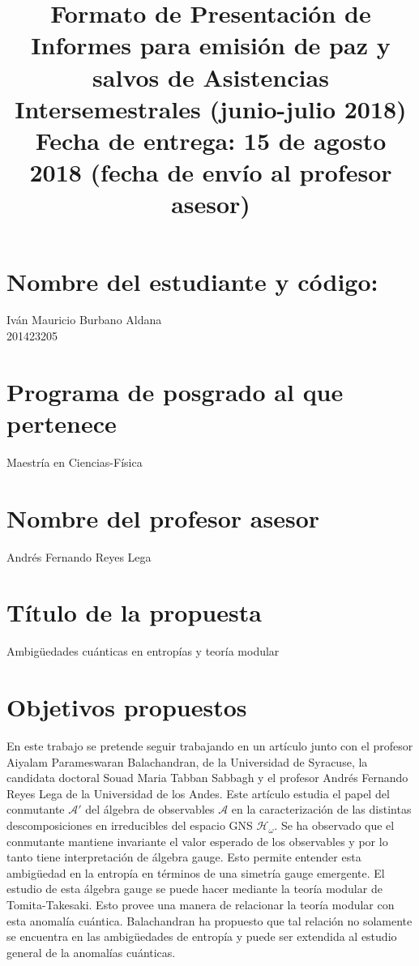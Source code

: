 \documentclass{article}
\title{Formato de Presentación de Informes para emisión de paz y salvos de Asistencias Intersemestrales (junio-julio 2018)
\\
Fecha de entrega: 15 de agosto 2018 (fecha de envío al profesor asesor)}
\author{}
\date{}
\begin{document}
\maketitle

\section{Nombre del estudiante y código:}

Iván Mauricio Burbano Aldana\\
201423205

\section{Programa de posgrado al que pertenece}

Maestría en Ciencias-Física

\section{Nombre del profesor asesor}

Andrés Fernando Reyes Lega

\section{Título de la propuesta}

Ambigüedades cuánticas en entropías y teoría modular

\section{Objetivos propuestos}

En este trabajo se pretende seguir trabajando en un artículo junto con el profesor Aiyalam Parameswaran Balachandran, de la Universidad de Syracuse, la candidata doctoral Souad Maria Tabban Sabbagh y el profesor Andrés Fernando Reyes Lega de la Universidad de los Andes. Este artículo estudia el papel del conmutante $\mathcal{A}'$ del álgebra de observables $\mathcal{A}$ en la caracterización de las distintas descomposiciones en irreducibles del espacio GNS $\mathcal{H}_\omega$. Se ha observado que el conmutante mantiene invariante el valor esperado de los observables y por lo tanto tiene interpretación de álgebra gauge. Esto permite entender esta ambigüedad en la entropía en términos de una simetría gauge emergente. El estudio de esta álgebra gauge se puede hacer mediante la teoría modular de Tomita-Takesaki. Esto provee una manera de relacionar la teoría modular con esta anomalía cuántica. Balachandran ha propuesto que tal relación no solamente se encuentra en las ambigüedades de entropía y puede ser extendida al estudio general de la anomalías cuánticas.
\end{document}
